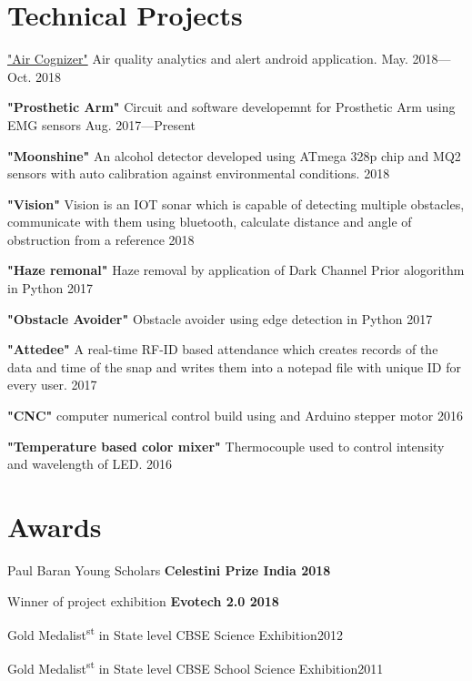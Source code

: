 \section{Technical Projects}
\begin{innerlist}
    \item  \href{bit.ly/AirCognizer}{"Air Cognizer"} Air quality analytics \newline and alert android application. \hfill {May. 2018---Oct. 2018}
    \item \textbf{"Prosthetic Arm"} Circuit and software developemnt for Prosthetic Arm using EMG sensors \hfill {Aug. 2017---Present}
    \item \textbf{"Moonshine"} An alcohol detector developed using ATmega 328p chip and MQ2 sensors with auto calibration against environmental conditions. \hfill {2018}
    \item \textbf{"Vision"} Vision is an IOT sonar which is capable of detecting multiple obstacles, communicate with them using bluetooth, calculate distance and angle of obstruction from a reference \hfill {2018}
    \item \textbf{"Haze remonal"} Haze removal by application of Dark Channel Prior alogorithm in Python \hfill {2017}
    \item \textbf{"Obstacle Avoider"} Obstacle avoider using edge detection in Python \hfill {2017}
    \item \textbf{"Attedee"} A real-time RF-ID based attendance which creates records of the data and time of the snap and writes them into a notepad file with unique ID for every user. \hfill {2017}
     \item \textbf{"CNC"} computer numerical control build using and Arduino stepper motor \hfill {2016}
     \item \textbf{"Temperature based color mixer"} Thermocouple used to control intensity and wavelength of LED. \hfill {2016}
\end{innerlist}


\section{Awards}
\begin{innerlist}
\item Paul Baran Young Scholars \textbf{Celestini Prize India 2018}
\item Winner of project exhibition \textbf{Evotech 2.0 2018}
\item Gold Medalist\textsuperscript{st} in State level CBSE Science Exhibition\hfill 2012
\item Gold Medalist\textsuperscript{st} in State level CBSE School Science Exhibition\hfill  2011
\end{innerlist}

